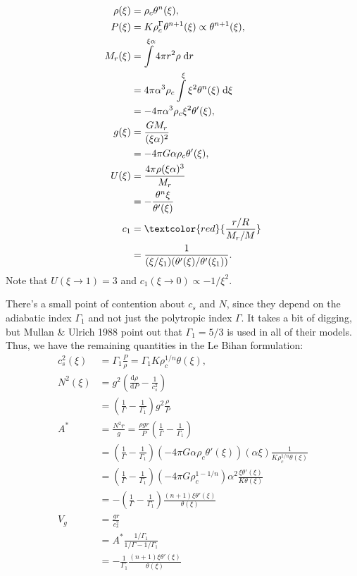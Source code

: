 \documentclass[11pt,
        usenames, %
        twocolumn,
        landscape,
        dvipsnames %
    ]{article}
\newcommand*{\rd}[2]{\frac{\mathrm{d}#1}{\mathrm{d}#2}}
\newcommand*{\p}[1]{\left(#1\right)}
\begin{document}
\begin{align}
    \rho(\xi) &= \rho_c \theta^n(\xi),\\
    P(\xi) &= K\rho_c^\Gamma \theta^{n + 1}(\xi) \propto \theta^{n + 1}(\xi),\\
    M_r(\xi) &= \int\limits^{\xi \alpha} 4\pi r^2\rho\;\mathrm{d}r\nonumber\\
        &= 4\pi \alpha^3 \rho_c
            \int\limits^{\xi} \xi^2\theta^n(\xi)\;\mathrm{d}\xi\nonumber\\
        &= -4\pi \alpha^3 \rho_c \xi^2\theta'(\xi),\\
    g(\xi) &= \frac{GM_r}{(\xi\alpha)^2}\nonumber\\
        &= -4\pi G \alpha \rho_c \theta'(\xi),\\
    U(\xi) &= \frac{4\pi \rho (\xi\alpha)^3}{M_r}\nonumber\\
        &= -\frac{\theta^n \xi}{\theta'(\xi)}\\
    c_1 &= \textcolor{red}{\frac{r / R}{M_r / M}}\nonumber\\
        &= \frac{1}{(\xi / \xi_1)(\theta'(\xi) / \theta'(\xi_1))}.
\end{align}
Note that $U(\xi \to 1) = 3$ and $c_1(\xi \to 0) \propto -1 / \xi^2$.

There's a small point of contention about $c_s$ and $N$, since they depend on
the adiabatic index $\Gamma_1$ and not just the polytropic index $\Gamma$. It
takes a bit of digging, but Mullan \& Ulrich 1988 point out that $\Gamma_1 =
5/3$ is used in all of their models. Thus, we have the remaining quantities in
the Le Bihan formulation:
\begin{align}
    c_s^2(\xi) &= \Gamma_1\frac{P}{\rho} = \Gamma_1 K\rho_c^{1/n}\theta(\xi)
        ,\\
    N^2(\xi) &= g^2\p{\rd{\rho}{P} - \frac{1}{c_s^2}}\nonumber\\
        &= \p{\frac{1}{\Gamma} - \frac{1}{\Gamma_1}}
            g^2\frac{\rho}{P}\nonumber\\
    A^* &= \frac{N^2r}{g} = \frac{\rho gr}{P}\p{\frac{1}{\Gamma} -
            \frac{1}{\Gamma_1}}\nonumber\\
        &= \p{\frac{1}{\Gamma} - \frac{1}{\Gamma_1}}
            \p{-4\pi G \alpha \rho_c \theta'(\xi)}\p{\alpha \xi}
            \frac{1}{K\rho_c^{1/n}\theta(\xi)}\nonumber\\
        &= \p{\frac{1}{\Gamma} - \frac{1}{\Gamma_1}}
            \p{-4\pi G \rho_c^{1 - 1/n}}
                \alpha^2
            \frac{\xi \theta'(\xi)}{K\theta(\xi)}\nonumber\\
        &= -\p{\frac{1}{\Gamma} - \frac{1}{\Gamma_1}}
            \frac{(n + 1)\xi \theta'(\xi)}{\theta(\xi)}\nonumber\\
    V_g &= \frac{gr}{c_s^2}\nonumber\\
        &= A^* \frac{1 / \Gamma_1}{1 / \Gamma - 1 / \Gamma_1}\nonumber\\
        &= -\frac{1}{\Gamma_1} \frac{(n + 1)\xi \theta'(\xi)}{\theta(\xi)}
\end{align}
\end{document}
